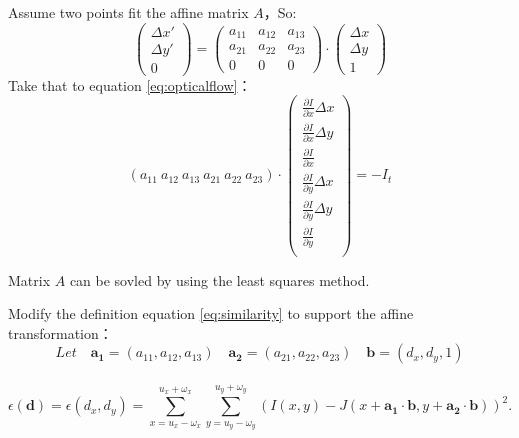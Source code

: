 Assume two points fit the affine matrix $A$，So:\\
\begin{equation}
	\left(
	\begin{array}{c}
		\Delta x'\\
		\Delta y'\\
		0
	\end{array}
	\right)
	=
	\left(
	\begin{array}{ccc}
		a_{11} & a_{12} & a_{13}\\
		a_{21} & a_{22} & a_{23}\\
				0 & 0 & 0
	\end{array}
	\right)
	\cdot
	\left(
	\begin{array}{c}
		\Delta x\\
		\Delta y\\
		1
	\end{array}
	\right)
\end{equation}
Take that to equation \ref{eq:opticalflow}：\\
\begin{equation}
	(a_{11}\ a_{12}\ a_{13}\ a_{21}\ a_{22}\ a_{23})\cdot
	\left(
	\begin{array}{c}
		\frac{\partial I}{\partial x}\Delta x\\
        \frac{\partial I}{\partial x}\Delta y\\
        \frac{\partial I}{\partial x}\\
        \frac{\partial I}{\partial y}\Delta x\\
        \frac{\partial I}{\partial y}\Delta y\\
        \frac{\partial I}{\partial y}\\
	\end{array}
	\right)
	=-I_t
\end{equation}

Matrix $A$ can be sovled by using the least squares method.

Modify the definition equation \ref{eq:similarity} to support the affine transformation：\\
\[ Let\quad \mathbf{a_1}=(a_{11},a_{12},a_{13})\quad \mathbf{a_2}=(a_{21},a_{22},a_{23})\quad
\mathbf{b}=(d_x,d_y,1)\]\\
\begin{equation}\label{eq:affine}
	\epsilon(\mathbf{d})=\epsilon(d_x,d_y)=\sum_{x=u_x-\omega_x}^{u_x+\omega_x}\sum_{y=u_y-\omega_y}
	^{u_y+\omega_y}(I(x,y) - J(x+\mathbf{a_1}\cdot \mathbf{b},y+\mathbf{a_2}\cdot \mathbf{b}))^2.
\end{equation}


